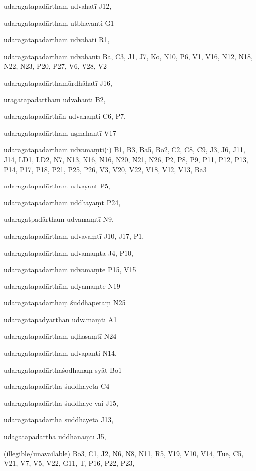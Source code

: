 \begin{marma}[hp02_009]
\begin{marma}[hp02_011]
\begin{marma}[hp02_25d]
\begin{description}
    \end{description}
 \end{marma}      
 
 \begin{marma}[hp02_26a]
\item[udaragatapadārtham udvahatī] J12,
\item[udaragatapadārthaṃ  utbhavanti] G1
\item[udaragatapadārtham udvahati] R1,
\item[udaragatapadārtham udvahantī] Ba, C3, J1, J7, Ko, N10, P6, V1, V16, N12, N18, N22, N23, P20, P27, V6, V28, V2
\item[udaragatapadārthamūrdhāhatī] J16,
\item[uragatapadārtham udvahantī] B2,
\item[udaragatapadārthān udvahaṃti] C6, P7, 
\item[udaragatapadārtham uşmahantī] V17
\item[udaragatapadārtham udvamaṃti(ī)] B1, B3, Ba5, Bo2, C2, C8, C9, J3, J6, J11, J14, LD1, LD2, N7, N13, N16, N16, N20, N21, N26, P2, P8, P9, P11, P12, P13, P14, P17, P18, P21, P25, P26, V3, V20, V22, V18, V12, V13, Ba3
\item[udaragatapadārtham udvayant] P5,
\item[udaragatapadārtham uddhayaṃt] P24, 
\item[udaragatpadārtham udvamaṃtī] N9,  
\item[udaragatapadārtham udvavaṃtī] J10, J17, P1,
\item[udaragatapadārtham udvamaṃta] J4, P10, 
\item[udaragatapadārtham udvamaṃte] P15, V15
\item[udaragatapadārthām udyamaṃte] N19
\item[udaragatapadārthaṃ śuddhapetaṃ] N25
\item[udaragatapadyarthān udvamaṃtī] A1
\item[udaragatapadārtham uḍhasaṃtī] N24
\item[udaragatapadārtham udvapanti] N14, 
\item[udaragatapadārthaśodhanaṃ syāt] Bo1
\item[udaragatapadārtha śuddhayeta] C4
\item[udaragatapadārtha śuddhaye vai] J15, 
\item[udaragatapadārtha suddhayeta] J13,
\item[udagatapadārtha uddhanaṃtī] J5,
\item[(illegible/unavailable)] Bo3, C1, J2, N6, N8, N11, R5, V19, V10, V14, Tue, C5, V21, V7, V5, V22, G11, T, P16, P22, P23, 
  \begin{description}
    \end{description}
 \end{marma}


\end{marma}
\end{marma}
